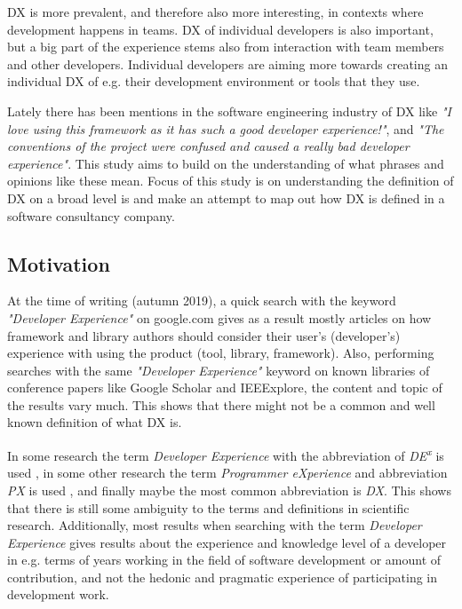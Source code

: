 \documentclass[english, 12pt, a4paper, sci, utf8, a-1b, online]{aaltothesis}
\newcommand{\now}{autumn 2019}
\begin{document}
DX is more prevalent, and therefore also more interesting, in contexts where development happens in teams. DX of individual developers is also important, but a big part of the experience stems also from interaction with team members and other developers. Individual developers are aiming more towards creating an individual DX of e.g. their development environment or tools that they use.

Lately there has been mentions in the software engineering industry of DX like \textit{"I love using this framework as it has such a good developer experience!"}, and \textit{"The conventions of the project were confused and caused a really bad developer experience"}. This study aims to build on the understanding of what phrases and opinions like these mean. Focus of this study is on understanding the definition of DX on a broad level is and make an attempt to map out how DX is defined in a software consultancy company.

\thispagestyle{empty}

\subsection{Motivation} \label{motivation}

At the time of writing (\now), a quick search with the keyword \textit{"Developer Experience"} on google.com gives as a result mostly articles on how framework and library authors should consider their user's (developer's) experience with using the product (tool, library, framework). Also, performing searches with the same \textit{"Developer Experience"} keyword on known libraries of conference papers like Google Scholar and IEEExplore, the content and topic of the results vary much. This shows that there might not be a common and well known definition of what DX is.

In some research the term \textit{Developer Experience} with the abbreviation of \textit{DE\textsuperscript{x}} is used \parencite{fagerholm-dx-concept-and-definition}, in some other research the term \textit{Programmer eXperience} and abbreviation \textit{PX} is used \parencite{programmer-experience}, and finally maybe the most common abbreviation is \textit{DX}. This shows that there is still some ambiguity to the terms and definitions in scientific research. Additionally, most results when searching with the term \textit{Developer Experience} gives results about the experience and knowledge level of a developer in e.g. terms of years working in the field of software development or amount of contribution, and not the hedonic and pragmatic experience of participating in development work.
\end{document}
